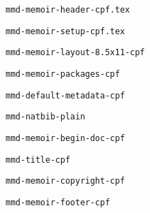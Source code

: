 
\def\mytitle{MMD Memoir Code}
\def\myauthor{Author}
\def\mydate{10 January 1231}
\def\latexmode{memoir}
\def\bibliocommand{}
\def\bibliostyle{chicago}
\def\subtitle{Subtitle}
\def\affiliation{Affiliation}
\def\address{Address}
\def\phone{757-123-1232}
\def\email{kjsdf@duk.eor}


\lstset{language=TeX} 

\texttt{mmd-memoir-header-cpf.tex}

\texttt{mmd-memoir-setup-cpf.tex}

\texttt{mmd-memoir-layout-8.5x11-cpf}

\texttt{mmd-memoir-packages-cpf}

\texttt{mmd-default-metadata-cpf}

\texttt{mmd-natbib-plain}

\texttt{mmd-memoir-begin-doc-cpf}

\texttt{mmd-title-cpf}

\texttt{mmd-memoir-copyright-cpf}

\texttt{mmd-memoir-footer-cpf}




